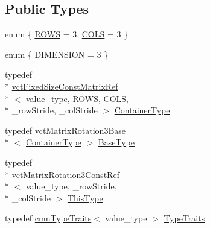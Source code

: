 \subsection*{Public Types}
\begin{DoxyCompactItemize}
\item 
enum \{ \hyperlink{classvct_matrix_rotation3_const_ref_ab3f61204b713365df89d134aecf5f257a2dfbffc885c6c6a8058f693056581cad}{R\-O\-W\-S} = 3, 
\hyperlink{classvct_matrix_rotation3_const_ref_ab3f61204b713365df89d134aecf5f257a6703147fc82b54abf5f259f447b078da}{C\-O\-L\-S} = 3
 \}
\item 
enum \{ \hyperlink{classvct_matrix_rotation3_const_ref_aa4e695dfd4ce5d7c16cef20759dd2a38a35d674f5d98f31d082dddd79c874ba25}{D\-I\-M\-E\-N\-S\-I\-O\-N} = 3
 \}
\item 
typedef \\*
\hyperlink{classvct_fixed_size_const_matrix_ref}{vct\-Fixed\-Size\-Const\-Matrix\-Ref}\\*
$<$ value\-\_\-type, \hyperlink{classvct_matrix_rotation3_const_ref_ab3f61204b713365df89d134aecf5f257a2dfbffc885c6c6a8058f693056581cad}{R\-O\-W\-S}, \hyperlink{classvct_matrix_rotation3_const_ref_ab3f61204b713365df89d134aecf5f257a6703147fc82b54abf5f259f447b078da}{C\-O\-L\-S}, \\*
\-\_\-row\-Stride, \-\_\-col\-Stride $>$ \hyperlink{classvct_matrix_rotation3_const_ref_ae183b3a17186cc240b1cba80e74d0724}{Container\-Type}
\item 
typedef \hyperlink{classvct_matrix_rotation3_base}{vct\-Matrix\-Rotation3\-Base}\\*
$<$ \hyperlink{classvct_matrix_rotation3_const_ref_ae183b3a17186cc240b1cba80e74d0724}{Container\-Type} $>$ \hyperlink{classvct_matrix_rotation3_const_ref_a72312c3cf0fe6a145043764cdd412bad}{Base\-Type}
\item 
typedef \\*
\hyperlink{classvct_matrix_rotation3_const_ref}{vct\-Matrix\-Rotation3\-Const\-Ref}\\*
$<$ value\-\_\-type, \-\_\-row\-Stride, \\*
\-\_\-col\-Stride $>$ \hyperlink{classvct_matrix_rotation3_const_ref_a92075d31084a3f4bb466e724a8719693}{This\-Type}
\item 
typedef \hyperlink{classcmn_type_traits}{cmn\-Type\-Traits}$<$ value\-\_\-type $>$ \hyperlink{classvct_matrix_rotation3_const_ref_aa8c0563184a7d080a880ca6b066b2440}{Type\-Traits}
\end{DoxyCompactItemize}
